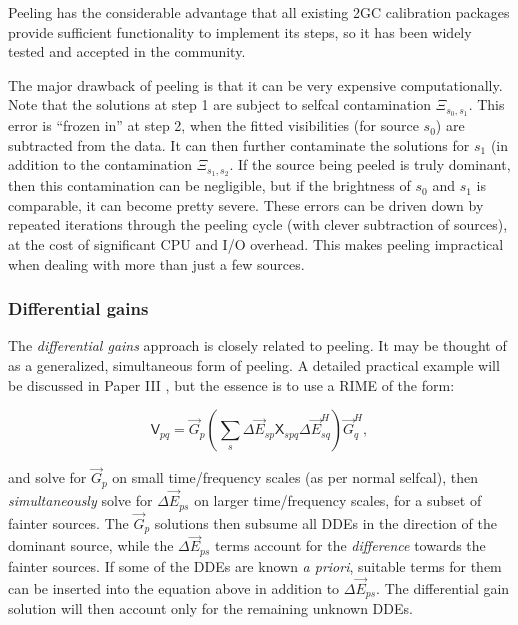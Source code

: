 \documentclass{aa}
\newcommand{\herm}{H}
\newcommand{\jones}[2]{\vec {#1}_{#2}}
\newcommand{\jonesT}[2]{\vec {#1}^{\herm}_{#2}}
\newcommand{\coh}[2]{\mathsf{{#1}}_{{#2}}}
\begin{document}
Peeling has the considerable advantage that all existing 2GC calibration packages provide sufficient functionality to implement its steps, so it has been widely tested and accepted in the community. 

The major drawback of peeling is that it can be very expensive computationally. Note that the solutions at step 1 are subject to selfcal contamination $\Xi_{s_0,s_1}$. This error is ``frozen in'' at step 2, when the fitted visibilities (for source $s_0$) are subtracted from the data. It can then further contaminate the solutions for $s_1$ (in addition to the contamination $\Xi_{s_1,s_2}$. If the source being peeled is truly dominant, then this contamination can be negligible, but if the brightness of $s_0$ and $s_1$ is comparable, it can become pretty severe. These errors can be driven down by repeated iterations through the peeling cycle (with clever subtraction of sources), at the cost of significant CPU and I/O overhead. This makes peeling impractical when dealing with more than just a few sources. 

\subsubsection{Differential gains\label{sec:dEs}}

The \emph{differential gains} approach is closely related to peeling. It may be thought of as a generalized, simultaneous form of peeling. A detailed practical example will be discussed in Paper III \citep{RRIME3}, but the essence is to use a RIME of the form:

\begin{equation}\label{eq:de}
\coh{V}{pq} = \jones{G}{p} \left( \sum_s \Delta\jones{E}{sp} \coh{X}{spq} \Delta\jonesT{E}{sq} \right)  \jonesT{G}{q},
\end{equation}

and solve for $\jones{G}{p}$ on small time/frequency scales (as per normal selfcal), then \emph{simultaneously} solve for $\Delta\jones{E}{ps}$ on larger time/frequency scales, for a subset of fainter sources. The $\jones{G}{p}$ solutions then subsume all DDEs in the direction of the dominant source, while the $\Delta\jones{E}{ps}$ terms account for the \emph{difference} towards the fainter sources. If some of the DDEs are known \emph{a priori}, suitable terms for them can be inserted into the equation above in addition to $\Delta\jones{E}{ps}$. The differential gain solution will then account only for the remaining unknown DDEs.
\end{document}
